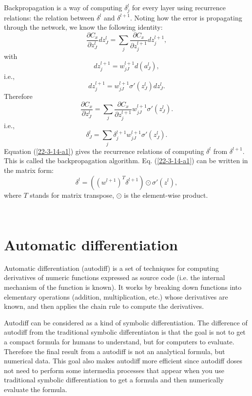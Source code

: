 \documentclass{article}
\begin{document}
Backpropagation is a way of computing $\delta^l_j$ for every layer using
recurrence relations: the relation between $\delta^l$ and $\delta^{l + 1}$.
Noting how the error is propagating through the network, we know the following
identity:
\begin{equation}
  \frac{\partial C_x}{\partial z_J^l} d z^l_J = \sum_j \frac{\partial
  C_x}{\partial z_j^{l + 1}} d z^{l + 1}_j,
\end{equation}
with
\begin{equation}
  d z_j^{l + 1} = w^{l + 1}_{j J} d (a^l_J),
\end{equation}
i.e.,
\begin{equation}
  d z_j^{l + 1} = w^{l + 1}_{j J} \sigma' (z^l_J) d z^l_J .
\end{equation}
Therefore
\begin{equation}
  \frac{\partial C_x}{\partial z_J^l} = \sum_j \frac{\partial C_x}{\partial
  z_j^{l + 1}} w^{l + 1}_{j J} \sigma' (z^l_J) .
\end{equation}
i.e.,
\begin{equation}
  \label{22-3-14-a1} \delta^l_J = \sum_j \delta^{l + 1}_j w^{l + 1}_{j J}
  \sigma' (z^l_J) .
\end{equation}
Equation (\ref{22-3-14-a1}) gives the recurrence relations of computing
$\delta^l$ from $\delta^{l + 1}$. This is called the backpropagation
algorithm. Eq. (\ref{22-3-14-a1}) can be written in the matrix form:
\begin{equation}
  \delta^l = ((w^{l + 1})^T \delta^{l + 1}) \odot \sigma' (z^l),
\end{equation}
where $T$ stands for matrix transpose, $\odot$ is the element-wise product.

\

\section{Automatic differentiation}

Automatic differentiation (autodiff) is a set of techniques for computing
derivatives of numeric functions expressed as source code (i.e. the internal
mechanism of the function is known). It works by breaking down functions into
elementary operations (addition, multiplication, etc.) whose derivatives are
known, and then applies the chain rule to compute the derivatives.

Autodiff can be considered as a kind of symbolic differentiation. The
difference of autodiff from the traditional symbolic differentiaton is that
the goal is not to get a compact formula for humans to understand, but for
computers to evaluate. Therefore the final result from a autodiff is not an
analytical formula, but numerical data. This goal also makes autodiff more
efficient since autodiff doses not need to perform some intermedia processes
that appear when you use traditional symbolic differentiation to get a formula
and then numerically evaluate the formula.
\end{document}
